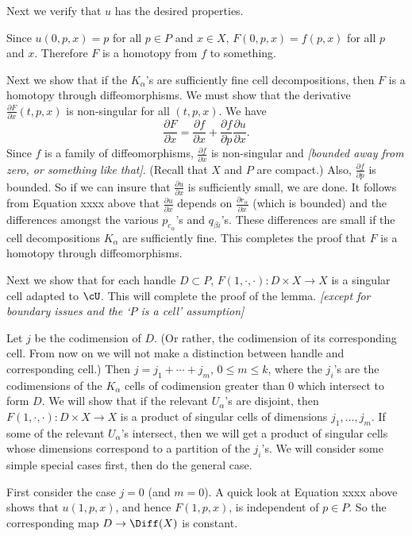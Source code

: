 \documentclass[11pt,leqno]{amsart}
\def\sub{\subset}
\def\pd#1#2{\frac{\partial #1}{\partial #2}}
\def\nn#1{{{\it \small [#1]}}}
\newcommand{\eq}[1]{\begin{displaymath}#1\end{displaymath}}
\begin{document}
\medskip

Next we verify that $u$ has the desired properties.

Since $u(0, p, x) = p$ for all $p\in P$ and $x\in X$, $F(0, p, x) = f(p, x)$ for all $p$ and $x$.
Therefore $F$ is a homotopy from $f$ to something.

Next we show that if the $K_\alpha$'s are sufficiently fine cell decompositions,
then $F$ is a homotopy through diffeomorphisms.
We must show that the derivative $\pd{F}{x}(t, p, x)$ is non-singular for all $(t, p, x)$.
We have
\eq{
    \pd{F}{x} = \pd{f}{x} + \pd{f}{p} \pd{u}{x} .
}
Since $f$ is a family of diffeomorphisms, $\pd{f}{x}$ is non-singular and
\nn{bounded away from zero, or something like that}.
(Recall that $X$ and $P$ are compact.)
Also, $\pd{f}{p}$ is bounded.
So if we can insure that $\pd{u}{x}$ is sufficiently small, we are done.
It follows from Equation xxxx above that $\pd{u}{x}$ depends on $\pd{r_\alpha}{x}$
(which is bounded)
and the differences amongst the various $p_{c_\alpha}$'s and $q_{\beta i}$'s.
These differences are small if the cell decompositions $K_\alpha$ are sufficiently fine.
This completes the proof that $F$ is a homotopy through diffeomorphisms.

\medskip

Next we show that for each handle $D \sub P$, $F(1, \cdot, \cdot) : D\times X \to X$
is a singular cell adapted to $\cU$.
This will complete the proof of the lemma.
\nn{except for boundary issues and the `$P$ is a cell' assumption}

Let $j$ be the codimension of $D$.
(Or rather, the codimension of its corresponding cell.  From now on we will not make a distinction
between handle and corresponding cell.)
Then $j = j_1 + \cdots + j_m$, $0 \le m \le k$,
where the $j_i$'s are the codimensions of the $K_\alpha$
cells of codimension greater than 0 which intersect to form $D$.
We will show that
if the relevant $U_\alpha$'s are disjoint, then
$F(1, \cdot, \cdot) : D\times X \to X$
is a product of singular cells of dimensions $j_1, \ldots, j_m$.
If some of the relevant $U_\alpha$'s intersect, then we will get a product of singular
cells whose dimensions correspond to a partition of the $j_i$'s.
We will consider some simple special cases first, then do the general case.

First consider the case $j=0$ (and $m=0$).
A quick look at Equation xxxx above shows that $u(1, p, x)$, and hence $F(1, p, x)$,
is independent of $p \in P$.
So the corresponding map $D \to \Diff(X)$ is constant.
\end{document}
